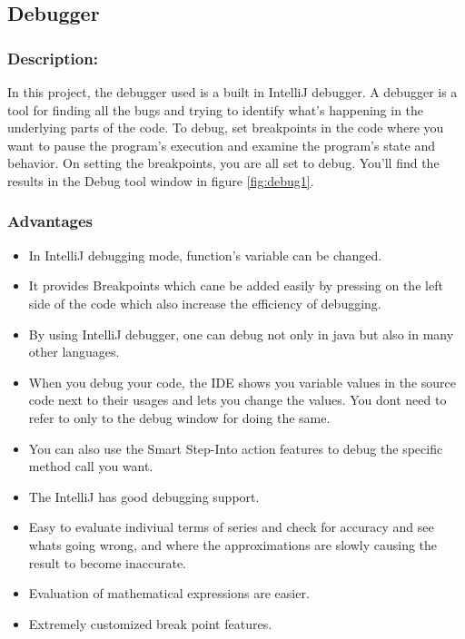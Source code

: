 \documentclass[letterpaper, 11pt]{article}
\begin{document}
\subsection{Debugger}
   \subsubsection{Description:}
    In this project, the debugger used is a built in IntelliJ debugger. A debugger is a tool for finding all the  bugs and trying to identify what's happening  in the underlying parts of the code. To debug, set breakpoints in the code  where you want to pause the program’s execution and examine the program’s state and behavior. On setting the breakpoints, you are all set to debug. You’ll find the results in the Debug tool window in figure \ref{fig:debug1}. \cite{Debugger1}

    \subsubsection{\textbf{Advantages}}
    \begin{itemize}
        \item In IntelliJ debugging mode, function's variable can be changed.
        \item It provides Breakpoints which cane be added easily by pressing on the left side of the code which also increase the efficiency of debugging.  
        \item By using IntelliJ debugger, one can debug not only in java but also in many other languages.
        \item When you debug your code, the IDE shows you variable values in the source code next to their usages and lets you change the values. You dont need to refer to only to the debug window for doing the same.
        \item You can also use the Smart Step-Into action features to debug  the specific method call you want.
        \item The IntelliJ has good debugging support.
        \item Easy to evaluate indiviual terms of series and check for accuracy and see whats going wrong, and where the approximations are slowly causing the result to become inaccurate.
        \item Evaluation of mathematical expressions are easier.
        \item Extremely customized break point features\cite{Debugger2}.
     \end{itemize}
\end{document}
